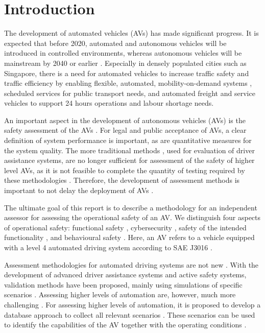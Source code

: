 \section{Introduction}
\label{sec:introduction}

The development of automated vehicles (AVs) has made significant progress. It is expected that before 2020, automated and autonomous vehicles will be introduced in controlled environments, whereas autonomous vehicles will be mainstream by 2040 \cite{madni2018autonomous} or earlier \cite{bimbraw2015autonomous}. Especially in densely populated cities such as Singapore, there is a need for automated vehicles to increase traffic safety and traffic efficiency by enabling flexible, automated, mobility-on-demand systems \cite{spieser2014toward}, scheduled services for public transport needs, and automated freight and service vehicles to support 24 hours operations and labour shortage needs.

An important aspect in the development of autonomous vehicles (AVs) is the safety assessment of the AVs \cite{bengler2014threedecades, stellet2015taxonomy, Helmer2017safety, putz2017pegasus, wachenfeld2016release}. For legal and public acceptance of AVs, a clear definition of system performance is important, as are quantitative measures for the system quality. The more traditional methods \cite{ISO26262, response2006code}, used for evaluation of driver assistance systems, are no longer sufficient for assessment of the safety of higher level AVs, as it is not feasible to complete the quantity of testing required by these methodologies \cite{wachenfeld2016release}. Therefore, the development of assessment methods is important to not delay the deployment of AVs \cite{bengler2014threedecades}.

The ultimate goal of this report is to describe a methodology for an independent assessor for assessing the operational safety of an AV. We distinguish four aspects of operational safety: functional safety \cite{ISO26262}, cybersecurity \cite{tr68cybersecurity}, safety of the intended functionality \cite{ISO21448}, and behavioural safety \cite{Waymo2017}. Here, an AV refers to a vehicle equipped with a level 4 automated driving system according to SAE J3016 \cite{sae2018j3016}.

Assessment methodologies for automated driving systems are not new \cite{alvarez2017prospective}. With the development of advanced driver assistance systems and active safety systems, validation methods have been proposed, mainly using simulations of specific scenarios \cite{gietelink2006development, deGelder2017assessment, lesemann2011test}. Assessing higher levels of automation are, however, much more challenging \cite{koopman2017interdisciplinary, koopman2016challenges}. For assessing higher levels of automation, it is proposed to develop a database approach to collect all relevant scenarios \cite{putz2017pegasus, winner2017pegasus, nhtsa2018framework}. These scenarios can be used to identify the capabilities of the AV together with the operating conditions \cite{nhtsa2018framework}. 

